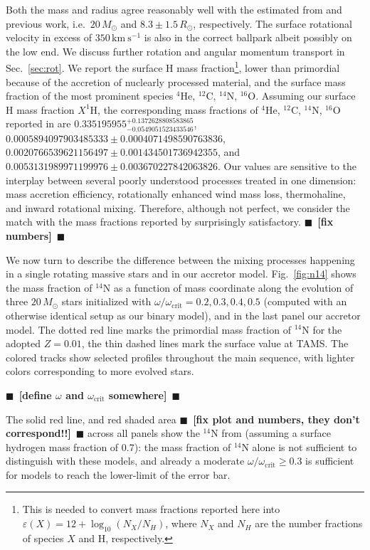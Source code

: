 \documentclass[twocolumn,twocolappendix,trackchanges]{aastex63}
\newcommand{\kms}{{\mathrm{km\ s^{-1}}}}
\DeclareRobustCommand{\Figref}[1]{Fig.~\ref{#1}}
\DeclareRobustCommand{\Secref}[1]{Sec.~\ref{#1}}
\newcommand{\todo}[1]{{\large $\blacksquare$~\textbf{\color{red}[#1]}}~$\blacksquare$}
\begin{document}
Both the mass and radius agree reasonably well with the estimated from
\cite{villamariz:05} and previous work, i.e.~$20\,M_\odot$ and
$8.3\pm1.5\,R_\odot$, respectively. The surface rotational velocity in
excess of $350\,\kms$ is also in the correct ballpark albeit possibly
on the low end. We discuss further rotation and angular momentum
transport in \Secref{sec:rot}. We report the surface H mass
fraction\footnote{This is needed to convert mass fractions reported
  here into $\varepsilon(X)=12+\log_{10}(N_X/N_H)$, where $N_X$ and
  $N_H$ are the number fractions of species $X$ and H, respectively.},
lower than primordial because of the accretion of nuclearly processed
material, and the surface mass fraction of the most prominent species
$^4\mathrm{He}$, $^{12}\mathrm{C}$, $^{14}\mathrm{N}$,
$^{16}\mathrm{O}$.  Assuming our surface H mass fraction
$X^1\mathrm{H}$, the corresponding mass fractions of $^4\mathrm{He}$,
$^{12}\mathrm{C}$, $^{14}\mathrm{N}$, $^{16}\mathrm{O}$ reported in
\cite{villamariz:05} are
$0.335195955^{+0.1372628808583865}_{-0.0549051523433546}$,
$0.0005894097903485333\pm0.0004071498590763836$,
$0.0020766539621156497\pm0.001434501736942355$, and
$0.0053131989971199976\pm0.003670227842063826$.  Our values are
sensitive to the interplay between several poorly understood
processes treated in one dimension: mass accretion efficiency, rotationally enhanced wind mass
loss, thermohaline, and inward rotational mixing. Therefore, although
not perfect, we consider the match with the mass fractions reported by
\cite{villamariz:05} surprisingly satisfactory. \todo{fix numbers}

We now turn to describe the difference between the mixing processes
happening in a single rotating massive stars and in our accretor
model. \Figref{fig:n14} shows the mass fraction of $^{14}\mathrm{N}$
as a function of mass coordinate along the evolution of three
$20\,M_\odot$ stars initialized with
$\omega/\omega_\mathrm{crit}=0.2,0.3,0.4,0.5$ (computed with an
otherwise identical setup as our binary model), and in the last panel
our accretor model. The dotted red line marks the primordial mass
fraction of $^{14}\mathrm{N}$ for the adopted $Z=0.01$, the thin
dashed lines mark the surface value at TAMS. The colored tracks show
selected profiles throughout the main sequence, with lighter colors
corresponding to more evolved stars.

\todo{define $\omega$ and $\omega_\mathrm{crit}$ somewhere}

The solid red line, and red shaded area \todo{fix plot and numbers,
  they don't correspond!!} across all panels show the
$^{14}\mathrm{N}$ from \cite{villamariz:05} (assuming a surface
hydrogen mass fraction of 0.7): the mass fraction of $^{14}\mathrm{N}$
alone is not sufficient to distinguish with these models, and already
a moderate $\omega/\omega_\mathrm{crit}\geq0.3$ is sufficient for
models to reach the lower-limit of the error bar.
\end{document}
